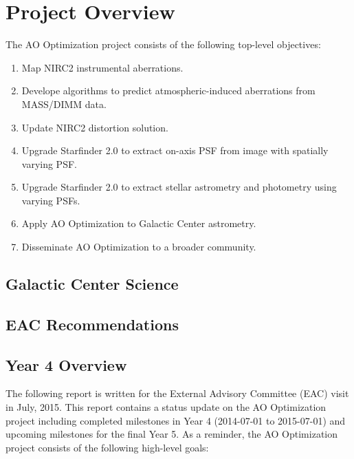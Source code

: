 \section{Project Overview}
\label{sec:overview}

The AO Optimization project consists of the following top-level
objectives:

\begin{enumerate}
\item Map NIRC2 instrumental aberrations.
\item Develope algorithms to predict atmospheric-induced aberrations
  from MASS/DIMM data.
\item Update NIRC2 distortion solution.
\item Upgrade Starfinder 2.0 to extract on-axis PSF from image with
  spatially varying PSF.
\item Upgrade Starfinder 2.0 to extract stellar astrometry and
  photometry using varying PSFs.
\item Apply AO Optimization to Galactic Center astrometry.
\item Disseminate AO Optimization to a broader community.
\end{enumerate}

\subsection{Galactic Center Science}


\subsection{EAC Recommendations}

\subsection{Year 4 Overview}
The following report is written for the External Advisory Committee (EAC) visit in July, 2015. This report contains a status update on the AO Optimization project including completed milestones in Year 4 (2014-07-01 to 2015-07-01) and upcoming milestones for the final Year 5. As a reminder, the AO Optimization project consists of the following high-level goals:

  
